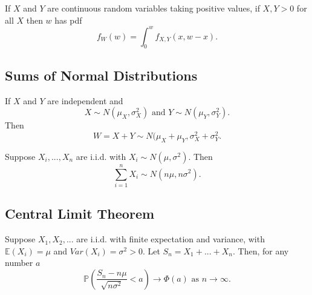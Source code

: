 \begin{prop}
    If $X$ and $Y$ are continuous random variables taking positive values, if $X,Y>0$ for all $X$ then $w$ has pdf
    \[f_W(w) = \int_{0}^w f_{X,Y}(x, w - x).\]
\end{prop}

\subsection{Sums of Normal Distributions}
\begin{prop}
   If $X$ and $Y$ are independent and
   \[X \sim N(\mu_X, \sigma_X^2) \text{ and } Y \sim N(\mu_Y, \sigma_Y^2).\]
   Then
   \[W = X + Y \sim N(\mu_X + \mu_Y, \sigma_X^2 + \sigma_Y^2.\]
\end{prop}

\begin{prop}
    Suppose $X_i, ...,X_n$ are i.i.d. with $X_i \sim N(\mu, \sigma^2)$. Then
    \[\sum_{ i = 1}^{n} X_i \sim N(n \mu, n \sigma^2).\]
\end{prop}

\subsection{Central Limit Theorem}

\begin{theorem}
  Suppose $X_1,X_2,...$ are i.i.d. with finite expectation and variance, with $\mathbb{E}(X_i) = \mu$ and $Var(X_i) = \sigma^2 > 0$. Let $S_n = X_1 + ... + X_n$. Then, for any number $a$
  \[\mathbb{P}\left(\frac{S_n - n \mu}{\sqrt{n \sigma^2}} < a\right) \rightarrow \Phi (a) \text{ as } n \rightarrow \infty.\]
\end{theorem}
